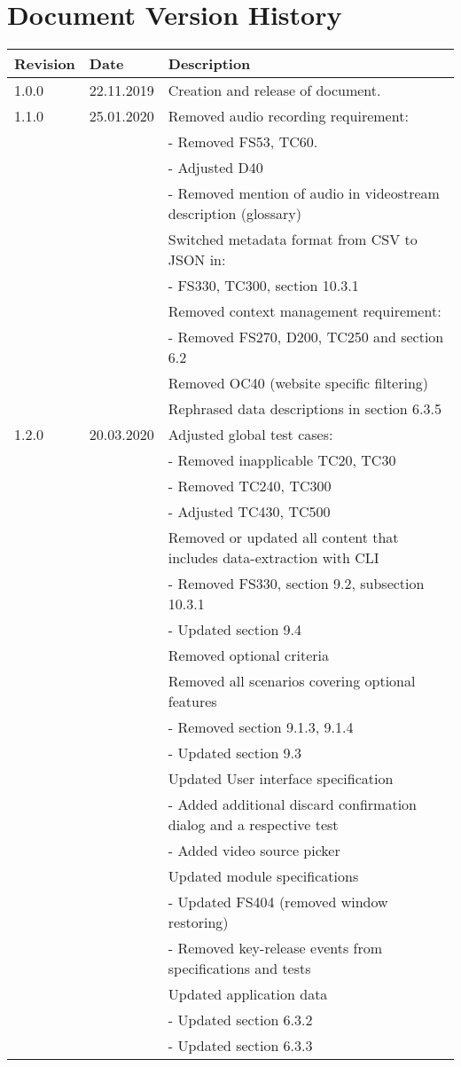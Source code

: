\chapter*{Document Version History}
\label{ch:versionhistory}
\begin{table}[h]
\begin{tabular}{lll}
\textbf{Revision} & \textbf{Date} & \textbf{Description}              \\
\hline
1.0.0             & 22.11.2019    & Creation and release of document. \\
\hline
1.1.0             & 25.01.2020    & Removed audio recording requirement: \\
&& - Removed FS53, TC60. \\
&& - Adjusted D40 \\
&& - Removed mention of audio in \gls{videostream} description (glossary) \\
&& Switched metadata format from CSV to JSON in:\\
&& - FS330, TC300, section 10.3.1 \\
&& Removed context management requirement:\\
&& - Removed FS270, D200, TC250 and section 6.2\\
&& Removed OC40 (website specific filtering)\\
&& Rephrased data descriptions in section 6.3.5\\
\hline
1.2.0           & 20.03.2020    & Adjusted global test cases: \\
&& - Removed inapplicable TC20, TC30\\
&& - Removed TC240, TC300\\
&& - Adjusted TC430, TC500\\
&& Removed or updated all content that includes data-extraction with CLI\\
&& - Removed FS330, section 9.2, subsection 10.3.1\\
&& - Updated section 9.4\\
&& Removed optional criteria\\
&& Removed all scenarios covering optional features\\
&& - Removed section 9.1.3, 9.1.4\\
&& - Updated section 9.3\\
&& Updated User interface specification\\
&& - Added additional discard confirmation dialog and a respective test\\
&& - Added video source picker\\
&& Updated module specifications\\
&& - Updated FS404 (removed window restoring)\\
&& - Removed key-release events from specifications and tests\\
&& Updated application data\\
&& - Updated section 6.3.2\\
&& - Updated section 6.3.3\\
\end{tabular}
\end{table}